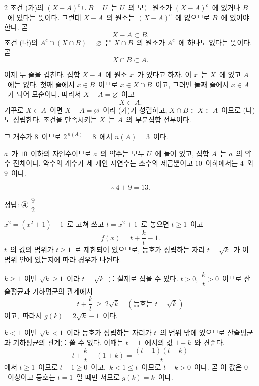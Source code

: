 \documentclass[10pt,fleqn]{article}
\begin{document}
\begin{multicols*}{2}
조건 (가)의 $(X-A)^{c}\cup B=U$\ 는 $U$\ 의 모든 원소가 $(X-A)^{c}$\ 에 있거나 $B$\ 에 있다는 뜻이다. 그런데 $X-A$\ 의 원소는 $(X-A)^{c}$\ 에 없으므로 $B$\ 에 있어야 한다. 곧
$$X-A\subset B.$$
조건 (나)의 $A^{c}\cap(X\cap B)=\varnothing$\ 은 $X\cap B$\ 의 원소가 $A^{c}$\ 에 하나도 없다는 뜻이다. 곧
$$X\cap B\subset A.$$

이제 두 줄을 겹친다. 집합 $X-A$\ 에 원소 $x$\ 가 있다고 하자. 이 $x$\ 는 $X$\ 에 있고 $A$\ 에는 없다. 첫째 줄에서 $x\in B$\ 이므로 $x\in X\cap B$\ 이고, 그러면 둘째 줄에서 $x\in A$\ 가 되어 모순이다. 따라서 $X-A=\varnothing$\ 이고
$$X\subset A.$$
거꾸로 $X\subset A$\ 이면 $X-A=\varnothing$\ 이라 (가)가 성립하고, $X\cap B\subset X\subset A$\ 이므로 (나)도 성립한다. 조건을 만족시키는 $X$\ 는 $A$\ 의 부분집합 전부이다.

그 개수가 $8$\ 이므로 $2^{\,n(A)}=8$\ 에서 $n(A)=3$\ 이다.

$a$\ 가 $10$\ 이하의 자연수이므로 $a$\ 의 약수는 모두 $U$\ 에 들어 있고, 집합 $A$\ 는 $a$\ 의 약수 전체이다. 약수의 개수가 세 개인 자연수는 소수의 제곱뿐이고 $10$\ 이하에서는 $4$\ 와 $9$\ 이다.

$$\therefore\ 4+9=13.$$


\begin{dmanswerbox}
정답: ④ $\dfrac{9}{2}$
\end{dmanswerbox}

$x^{2}=(x^{2}+1)-1$\ 로 고쳐 쓰고 $t=x^{2}+1$\ 로 놓으면 $t\ge 1$\ 이고
$$f(x)=t+\dfrac{k}{t}-1.$$
$t$\ 의 값의 범위가 $t\ge 1$\ 로 제한되어 있으므로, 등호가 성립하는 자리 $t=\sqrt{k}$\ 가 이 범위 안에 있는지에 따라 경우가 나뉜다.

$k\ge 1$\ 이면 $\sqrt{k}\ge 1$\ 이라 $t=\sqrt{k}$\ 를 실제로 잡을 수 있다. $t>0$,\ $\dfrac{k}{t}>0$\ 이므로 산술평균과 기하평균의 관계에서
$$t+\dfrac{k}{t}\ \ge\ 2\sqrt{k}\quad\left(\text{등호는 }t=\sqrt{k}\right)$$
이고,\ 따라서 $g(k)=2\sqrt{k}-1$\ 이다.

$k<1$\ 이면 $\sqrt{k}<1$\ 이라 등호가 성립하는 자리가 $t$\ 의 범위 밖에 있으므로 산술평균과 기하평균의 관계를 쓸 수 없다. 이때는 $t=1$\ 에서의 값 $1+k$\ 와 견준다.
$$t+\dfrac{k}{t}-(1+k)=\dfrac{(t-1)(t-k)}{t}$$
에서 $t\ge 1$\ 이므로 $t-1\ge 0$\ 이고,\ $k<1\le t$\ 이므로 $t-k>0$\ 이다. 곧 이 값은 $0$\ 이상이고 등호는 $t=1$\ 일 때만 서므로 $g(k)=k$\ 이다.


\end{multicols*}
\end{document}
